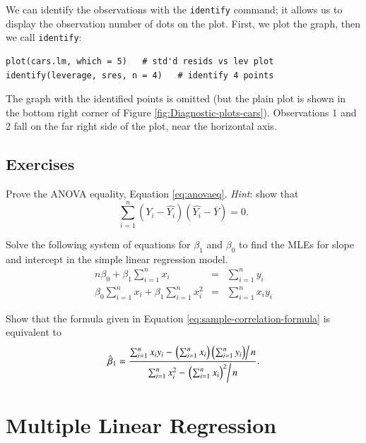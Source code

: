 \documentclass[captions=tableheading]{scrbook}
\begin{document}
We can identify the observations with the \texttt{identify} command; it allows us to display the observation number of dots on the plot. First, we plot the graph, then we call \texttt{identify}:


\begin{verbatim}
plot(cars.lm, which = 5)   # std'd resids vs lev plot
identify(leverage, sres, n = 4)   # identify 4 points
\end{verbatim}

The graph with the identified points is omitted (but the plain plot is shown in the bottom right corner of Figure \ref{fig:Diagnostic-plots-cars}). Observations 1 and 2 fall on the far right side of the plot, near the horizontal axis.

\newpage{}
\section{Exercises}
\label{sec-11-6}

\setcounter{thm}{0}

\begin{xca}
Prove the ANOVA equality, Equation \ref{eq:anovaeq}. \emph{Hint}:
show that
\[
\sum_{i=1}^{n}(Y_{i}-\hat{Y_{i}})(\hat{Y_{i}}-\overline{Y})=0.
\]
\end{xca}

\begin{xca}
\label{xca:find-mles-SLR}
Solve the following system of equations for \(\beta_{1}\) and \(\beta_{0}\) to find the MLEs for slope and intercept in the simple linear regression model.
\begin{eqnarray*}
n\beta_{0}+\beta_{1}\sum_{i=1}^{n}x_{i} & = & \sum_{i=1}^{n}y_{i}\\
\beta_{0}\sum_{i=1}^{n}x_{i}+\beta_{1}\sum_{i=1}^{n}x_{i}^{2} & = & \sum_{i=1}^{n}x_{i}y_{i}
\end{eqnarray*}
\end{xca}

\begin{xca}
\label{xca:show-alternate-slope-formula}
Show that the formula given in Equation \ref{eq:sample-correlation-formula} is equivalent to
\[
\hat{\beta}_{1} = \frac{\sum_{i=1}^{n}x_{i}y_{i}-\left.\left(\sum_{i=1}^{n}x_{i}\right)\left(\sum_{i=1}^{n}y_{i}\right)\right\slash n}{\sum_{i=1}^{n}x_{i}^{2}-\left.\left(\sum_{i=1}^{n}x_{i}\right)^{2}\right\slash n}.
\]
\end{xca}
\chapter{Multiple Linear Regression}
\label{sec-12}
\end{document}
